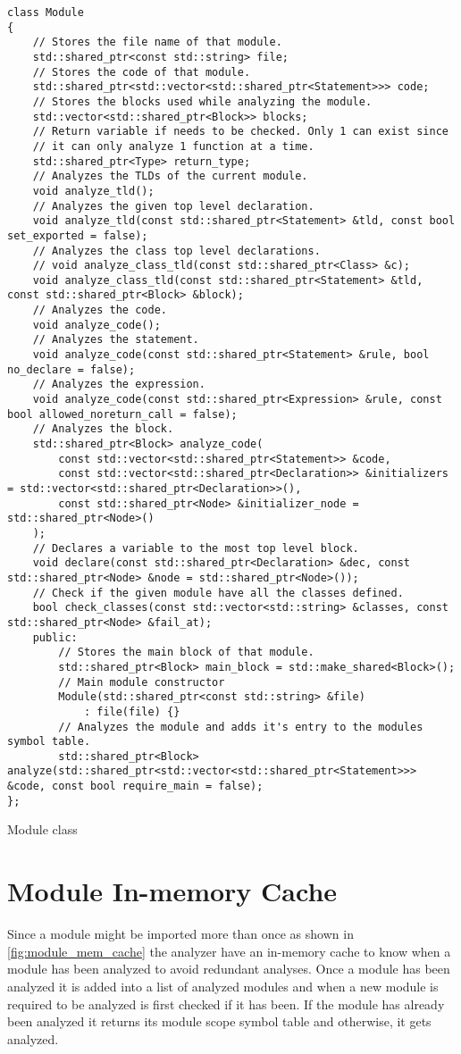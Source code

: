 \begin{code}
\begin{verbatim}
class Module
{
    // Stores the file name of that module.
    std::shared_ptr<const std::string> file;
    // Stores the code of that module.
    std::shared_ptr<std::vector<std::shared_ptr<Statement>>> code;
    // Stores the blocks used while analyzing the module.
    std::vector<std::shared_ptr<Block>> blocks;
    // Return variable if needs to be checked. Only 1 can exist since
    // it can only analyze 1 function at a time.
    std::shared_ptr<Type> return_type;
    // Analyzes the TLDs of the current module.
    void analyze_tld();
    // Analyzes the given top level declaration.
    void analyze_tld(const std::shared_ptr<Statement> &tld, const bool set_exported = false);
    // Analyzes the class top level declarations.
    // void analyze_class_tld(const std::shared_ptr<Class> &c);
    void analyze_class_tld(const std::shared_ptr<Statement> &tld, const std::shared_ptr<Block> &block);
    // Analyzes the code.
    void analyze_code();
    // Analyzes the statement.
    void analyze_code(const std::shared_ptr<Statement> &rule, bool no_declare = false);
    // Analyzes the expression.
    void analyze_code(const std::shared_ptr<Expression> &rule, const bool allowed_noreturn_call = false);
    // Analyzes the block.
    std::shared_ptr<Block> analyze_code(
        const std::vector<std::shared_ptr<Statement>> &code,
        const std::vector<std::shared_ptr<Declaration>> &initializers = std::vector<std::shared_ptr<Declaration>>(),
        const std::shared_ptr<Node> &initializer_node = std::shared_ptr<Node>()
    );
    // Declares a variable to the most top level block.
    void declare(const std::shared_ptr<Declaration> &dec, const std::shared_ptr<Node> &node = std::shared_ptr<Node>());
    // Check if the given module have all the classes defined.
    bool check_classes(const std::vector<std::string> &classes, const std::shared_ptr<Node> &fail_at);
    public:
        // Stores the main block of that module.
        std::shared_ptr<Block> main_block = std::make_shared<Block>();
        // Main module constructor
        Module(std::shared_ptr<const std::string> &file)
            : file(file) {}
        // Analyzes the module and adds it's entry to the modules symbol table.
        std::shared_ptr<Block> analyze(std::shared_ptr<std::vector<std::shared_ptr<Statement>>> &code, const bool require_main = false);
};
\end{verbatim}
\caption{Module class}
\label{ls:module_class}
\end{code}

\section{Module In-memory Cache}

Since a module might be imported more than once as shown in \autoref{fig:module_mem_cache} the analyzer
have an in-memory cache to know when a module has been analyzed to avoid redundant analyses.
Once a module has been analyzed it is added into a list of analyzed modules and when a new module is required to be
analyzed is first checked if it has been. If the module has already been analyzed it returns its module scope symbol table and otherwise, it gets analyzed.
